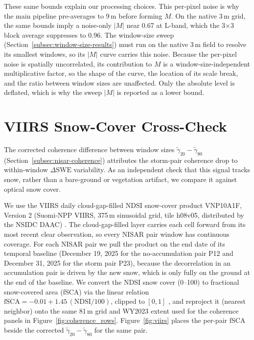 \documentclass[tc, manuscript]{copernicus}
\begin{document}
These same bounds explain our processing choices. This per-pixel noise is why the main pipeline pre-averages to 9\,\unit{m} before forming $M$. On the native 3\,\unit{m} grid, the same bounds imply a noise-only $|M|$ near 0.67 at L-band, which the 3$\times$3 block average suppresses to 0.96. The window-size sweep (Section~\ref{subsec:window-size-results}) must run on the native 3\,\unit{m} field to resolve its smallest windows, so its $|M|$ curve carries this noise. Because the per-pixel noise is spatially uncorrelated, its contribution to $M$ is a window-size-independent multiplicative factor, so the shape of the curve, the location of its scale break, and the ratio between window sizes are unaffected. Only the absolute level is deflated, which is why the sweep $|M|$ is reported as a lower bound.

\section{VIIRS Snow-Cover Cross-Check}\label{appendix:viirs}    %
\appendixfigures
The corrected coherence difference between window sizes $\tilde{\gamma}_{20}-\tilde{\gamma}_{80}$ (Section~\ref{subsec:nisar-coherence}) attributes the storm-pair coherence drop to within-window $\Delta\mathrm{SWE}$ variability. As an independent check that this signal tracks snow, rather than a bare-ground or vegetation artifact, we compare it against optical snow cover.

We use the VIIRS daily cloud-gap-filled NDSI snow-cover product VNP10A1F, Version 2 (Suomi-NPP VIIRS, 375\,\unit{m} sinusoidal grid, tile h08v05, distributed by the NSIDC DAAC) \citep{riggs2022vnp10a1f}. The cloud-gap-filled layer carries each cell forward from its most recent clear observation, so every NISAR pair window has continuous coverage. For each NISAR pair we pull the product on the end date of its temporal baseline (December 19, 2025 for the no-accumulation pair P12 and December 31, 2025 for the storm pair P23), because the decorrelation in an accumulation pair is driven by the new snow, which is only fully on the ground at the end of the baseline. We convert the NDSI snow cover (0--100) to fractional snow-covered area (fSCA) via the linear relation $\mathrm{fSCA} = -0.01 + 1.45\,(\mathrm{NDSI}/100)$, clipped to $[0,1]$ \citep{salomonson2004}, and reproject it (nearest neighbor) onto the same 81\,\unit{m} grid and WY2023 extent used for the coherence panels in Figure~\ref{fig:coherence_rows}. Figure~\ref{fig:viirs} places the per-pair fSCA beside the corrected $\tilde{\gamma}_{20}-\tilde{\gamma}_{80}$ for the same pair.
\end{document}
